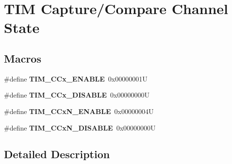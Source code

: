\hypertarget{group___t_i_m___channel___c_c___state}{}\section{T\+IM Capture/\+Compare Channel State}
\label{group___t_i_m___channel___c_c___state}
\subsection*{Macros}
\begin{DoxyCompactItemize}
\item 
\mbox{\label{group___t_i_m___channel___c_c___state_ga7b214df0d5c67138de7bc84e937909f0}} 
\#define {\bfseries T\+I\+M\+\_\+\+C\+Cx\+\_\+\+E\+N\+A\+B\+LE}~0x00000001U
\item 
\mbox{\label{group___t_i_m___channel___c_c___state_ga5068d16e01778cd3bd09555013b2f4d3}} 
\#define {\bfseries T\+I\+M\+\_\+\+C\+Cx\+\_\+\+D\+I\+S\+A\+B\+LE}~0x00000000U
\item 
\mbox{\label{group___t_i_m___channel___c_c___state_ga69ecb0bf5dcd5ecf30af36d6fc00ea0d}} 
\#define {\bfseries T\+I\+M\+\_\+\+C\+Cx\+N\+\_\+\+E\+N\+A\+B\+LE}~0x00000004U
\item 
\mbox{\label{group___t_i_m___channel___c_c___state_ga241183326d83407f7cc7dbd292533240}} 
\#define {\bfseries T\+I\+M\+\_\+\+C\+Cx\+N\+\_\+\+D\+I\+S\+A\+B\+LE}~0x00000000U
\end{DoxyCompactItemize}


\subsection{Detailed Description}

